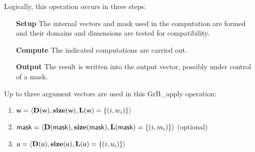 Logically, this operation occurs in three steps:
\begin{enumerate}[leftmargin=0.75in]
\item[\bf Setup] The internal vectors and mask used in the computation are formed 
and their domains and dimensions are tested for compatibility.
\item[\bf Compute] The indicated computations are carried out.
\item[\bf Output] The result is written into the output vector, possibly under 
control of a mask.
\end{enumerate}

Up to three argument vectors are used in this {\sf GrB\_apply} operation:
\begin{enumerate}
    \item ${\sf w} = \langle \bold{D}({\sf w}),\bold{size}({\sf w}),
    \bold{L}({\sf w}) = \{(i,w_i) \} \rangle$

    \item ${\sf mask} = \langle \bold{D}({\sf mask}),\bold{size}({\sf mask}),
    \bold{L}({\sf mask}) = \{(i,m_i) \} \rangle$ (optional)

    \item ${\sf u} = \langle \bold{D}({\sf u}),\bold{size}({\sf u}),
    \bold{L}({\sf u}) = \{(i,u_i) \} \rangle$
\end{enumerate}

